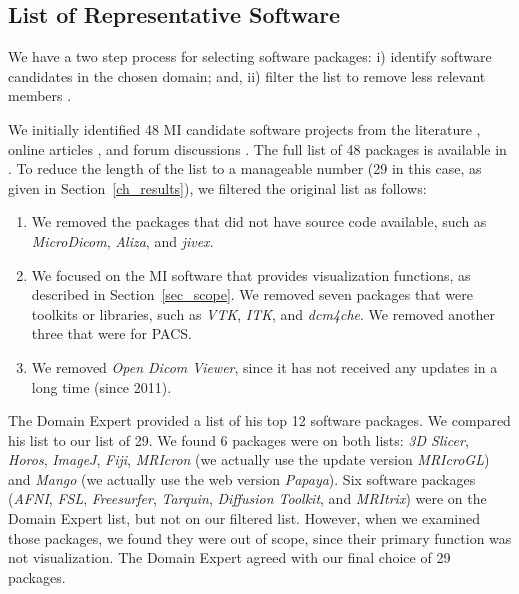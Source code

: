 \documentclass[final, 3p, times, authoryear]{elsarticle}
\begin{document}
\subsection{List of Representative Software} \label{sec_software_selection}

We have a two step process for selecting software packages: i) identify software
candidates in the chosen domain; and, ii) filter the list to remove less
relevant members \citep{SmithEtAl2021}.

We initially identified 48 MI candidate software projects from the literature
\citep{Bjorn2017, Bruhschwein2019, Haak2015}, online articles \citep{Emms2019,
Hasan2020, Mu2019}, and forum discussions \citep{Samala2014}.  The full list of
48 packages is available in \citet{Dong2021}.  To reduce the length of the list
to a manageable number (29 in this case, as given in Section~\ref{ch_results}),
we filtered the original list as follows:

\begin{enumerate}

\item We removed the packages that did not have source code available, such as
\textit{MicroDicom}, \textit{Aliza}, and \textit{jivex}.

\item We focused on the MI software that provides visualization functions, as
described in Section~\ref{sec_scope}. We removed seven packages that were
toolkits or libraries, such as \textit{VTK}, \textit{ITK}, and \textit{dcm4che}.
We removed another three that were for PACS.

\item We removed \textit{Open Dicom Viewer}, since it has not received any
updates in a long time (since 2011).

\end{enumerate}

The Domain Expert provided a list of his top 12 software packages.  We compared
his list to our list of 29.  We found 6 packages were on both lists: \textit{3D
Slicer}, \textit{Horos}, \textit{ImageJ}, \textit{Fiji}, \textit{MRIcron} (we
actually use the update version \textit{MRIcroGL}) and \textit{Mango} (we
actually use the web version \textit{Papaya}).  Six software packages
(\textit{AFNI}, \textit{FSL}, \textit{Freesurfer}, \textit{Tarquin},
\textit{Diffusion Toolkit}, and \textit{MRItrix}) were on the Domain Expert
list, but not on our filtered list.  However, when we examined those packages,
we found they were out of scope, since their primary function was not
visualization.  The Domain Expert agreed with our final choice of 29 packages.
\end{document}
